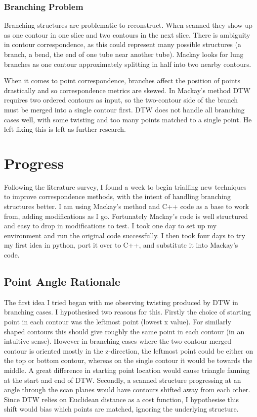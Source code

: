 \documentclass[10pt]{article}
\begin{document}
\subsubsection{Branching Problem}

Branching structures are problematic to reconstruct. When scanned they show up as one contour in one slice and two contours in the next slice. There is ambiguity in contour correspondence, as this could represent many possible structures (a branch, a bend, the end of one tube near another tube). Mackay \cite{mackay2019robust} looks for lung branches as one contour approximately splitting in half into two nearby contours.

When it comes to point correspondence, branches affect the position of points drastically and so correspondence metrics are skewed. In Mackay's \cite{mackay2019robust} method DTW requires two ordered contours as input, so the two-contour side of the branch must be merged into a single contour first. DTW does not handle all branching cases well, with some twisting and too many points matched to a single point. He left fixing this is left as further research.

\section{Progress}

Following the literature survey, I found a week to begin trialling new techniques to improve correspondence methods, with the intent of handling branching structures better. I am using Mackay's method and C++ code as a base to work from, adding modifications as I go. Fortunately Mackay's code is well structured and easy to drop in modifications to test. I took one day to set up my environment and run the original code successfully. I then took four days to try my first idea in python, port it over to C++, and substitute it into Mackay's code.

\subsection{Point Angle Rationale}

The first idea I tried began with me observing twisting produced by DTW in branching cases. I hypothesised two reasons for this. Firstly the choice of starting point in each contour was the leftmost point (lowest x value). For similarly shaped contours this should give roughly the same point in each contour (in an intuitive sense). However in branching cases where the two-contour merged contour is oriented mostly in the z-direction, the leftmost point could be either on the top or bottom contour, whereas on the single contour it would be towards the middle. A great difference in starting point location would cause triangle fanning at the start and end of DTW. Secondly, a scanned structure progressing at an angle through the scan planes would have contours shifted away from each other. Since DTW relies on Euclidean distance as a cost function, I hypothesise this shift would bias which points are matched, ignoring the underlying structure.
\end{document}
